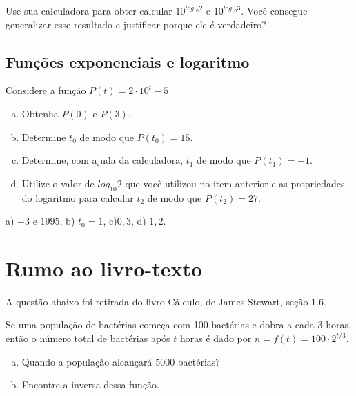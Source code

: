 \documentclass[main.tex]{subfiles}
\begin{document}
\begin{reflita}
 Use sua calculadora para obter calcular $10^{log_{10} 2}$ e $10^{log_{10} 3}$. Você consegue generalizar esse resultado e justificar porque ele é verdadeiro?
\end{reflita}


\subsection*{Funções exponenciais e logaritmo}

\begin{questao}
Considere a função $P(t)=2 \cdot 10^t - 5$
\begin{enumerate}[a)]
\item Obtenha $P(0)$ e $P(3)$.
\item Determine $t_0$ de modo que $P(t_0)=15$.
\item Determine, com ajuda da calculadora, $t_1$ de modo que $P(t_1)=-1$.
\item Utilize o valor de $log_{10} 2$ que você utilizou no item anterior e as propriedades do logaritmo para calcular $t_2$ de modo que $P(t_2)=27$.
\end{enumerate}
\end{questao}

\begin{gabarito}
	\begin{gabaritoQuestao}
		a) $-3$ e $1995$, b) $t_0=1$, c)$0,3$, d) $1,2$.
	\end{gabaritoQuestao}
\end{gabarito}

\newpage

\section{Rumo ao livro-texto}

A questão abaixo foi retirada do livro Cálculo, de James Stewart, seção 1.6.

\begin{resolvida}
Se uma população de bactérias começa com 100 bactérias e dobra a cada 3 horas, então o número total de bactérias após $t$ horas é dado por $n= f(t) = 100 \cdot 2^{t/3}$.
\begin{enumerate}[a)]
 \item Quando a população alcançará 5000 bactérias?
 \item Encontre a inversa dessa função.
\end{enumerate}
\end{resolvida}
\end{document}

